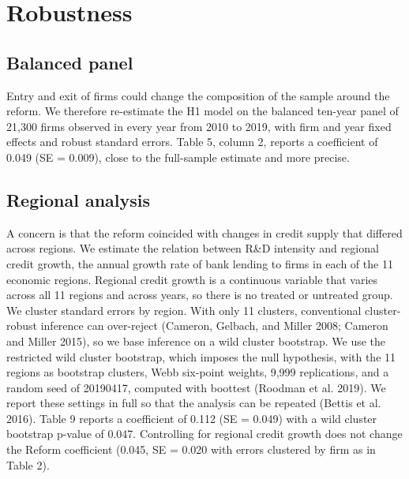 \documentclass[12pt]{article}
\begin{document}
\section{Robustness}

\subsection{Balanced panel}

Entry and exit of firms could change the composition of the sample around the reform. We therefore re-estimate the H1 model on the balanced ten-year panel of 21,300 firms observed in every year from 2010 to 2019, with firm and year fixed effects and robust standard errors. Table 5, column 2, reports a coefficient of 0.049 (SE = 0.009), close to the full-sample estimate and more precise.

\subsection{Regional analysis}

A concern is that the reform coincided with changes in credit supply that differed across regions. We estimate the relation between R\&D intensity and regional credit growth, the annual growth rate of bank lending to firms in each of the 11 economic regions. Regional credit growth is a continuous variable that varies across all 11 regions and across years, so there is no treated or untreated group. We cluster standard errors by region. With only 11 clusters, conventional cluster-robust inference can over-reject (Cameron, Gelbach, and Miller 2008; Cameron and Miller 2015), so we base inference on a wild cluster bootstrap. We use the restricted wild cluster bootstrap, which imposes the null hypothesis, with the 11 regions as bootstrap clusters, Webb six-point weights, 9,999 replications, and a random seed of 20190417, computed with boottest (Roodman et al. 2019). We report these settings in full so that the analysis can be repeated (Bettis et al. 2016). Table 9 reports a coefficient of 0.112 (SE = 0.049) with a wild cluster bootstrap p-value of 0.047. Controlling for regional credit growth does not change the Reform coefficient (0.045, SE = 0.020 with errors clustered by firm as in Table 2).
\end{document}
